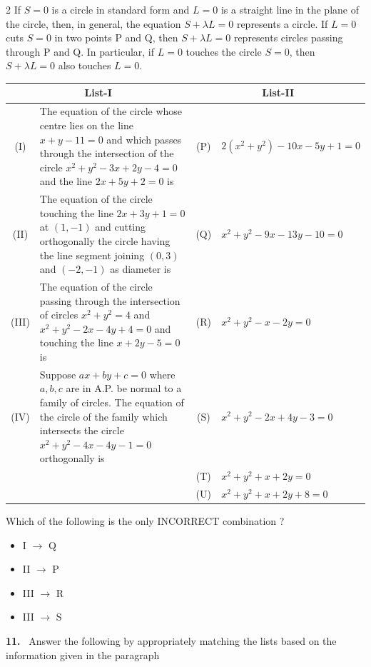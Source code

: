 \documentclass[10pt]{extarticle}
\newcommand{\qn}[1]{\par\smallskip\noindent\textbf{#1.}~}
\newenvironment{qoptions}{\begin{itemize}[leftmargin=1.8em,itemsep=1pt,topsep=2pt,label={}]}{\end{itemize}}
\newcommand{\opt}[2]{\item[(#1)] #2}
\begin{document}
\begin{multicols}{2}
If $S=0$ is a circle in standard form and $L=0$ is a straight line in the plane of the circle, then, in general, the equation $S+\lambda L=0$ represents a circle. If $L=0$ cuts $S=0$ in two points P and Q, then $S+\lambda L=0$ represents circles passing through P and Q. In particular, if $L=0$ touches the circle $S=0$, then $S+\lambda L=0$ also touches $L=0$.
\begin{center}\small\setlength{\tabcolsep}{3pt}
\begin{tabular}{|c|p{3.7cm}|c|p{2.5cm}|}
\hline
\multicolumn{2}{|c|}{List-I} & \multicolumn{2}{c|}{List-II}\\ \hline
(I) & The equation of the circle whose centre lies on the line $x+y-11=0$ and which passes through the intersection of the circle $x^2+y^2-3x+2y-4=0$ and the line $2x+5y+2=0$ is & (P) & $2(x^2+y^2)-10x-5y+1=0$\\ \hline
(II) & The equation of the circle touching the line $2x+3y+1=0$ at $(1,-1)$ and cutting orthogonally the circle having the line segment joining $(0,3)$ and $(-2,-1)$ as diameter is & (Q) & $x^2+y^2-9x-13y-10=0$\\ \hline
(III) & The equation of the circle passing through the intersection of circles $x^2+y^2=4$ and $x^2+y^2-2x-4y+4=0$ and touching the line $x+2y-5=0$ is & (R) & $x^2+y^2-x-2y=0$\\ \hline
(IV) & Suppose $ax+by+c=0$ where $a,b,c$ are in A.P. be normal to a family of circles. The equation of the circle of the family which intersects the circle $x^2+y^2-4x-4y-1=0$ orthogonally is & (S) & $x^2+y^2-2x+4y-3=0$\\ \hline
 & & (T) & $x^2+y^2+x+2y=0$\\ \hline
 & & (U) & $x^2+y^2+x+2y+8=0$\\ \hline
\end{tabular}
\end{center}
Which of the following is the only INCORRECT combination ?
\begin{qoptions}
\opt{A}{I $\to$ Q}
\opt{B}{II $\to$ P}
\opt{C}{III $\to$ R}
\opt{D}{III $\to$ S}
\end{qoptions}
\qn{11} Answer the following by appropriately matching the lists based on the information given in the paragraph


\end{multicols}
\end{document}
